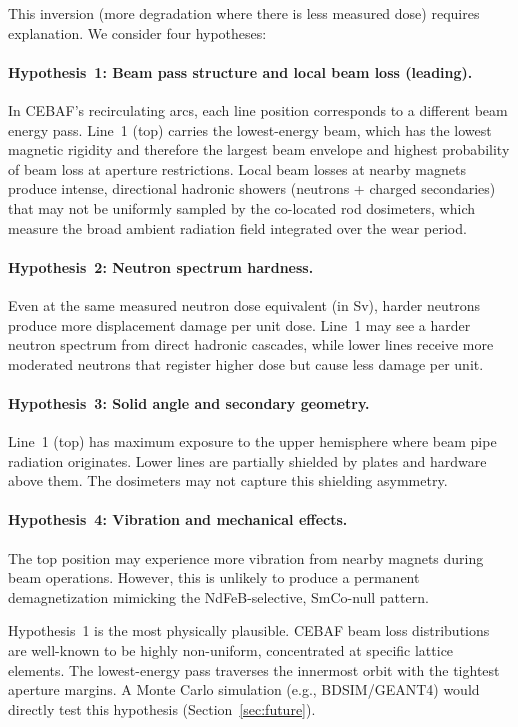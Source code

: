 \documentclass[11pt,letterpaper]{article}
\newcommand{\CEBAF}{CEBAF}
\begin{document}
This inversion (more degradation where there is less measured dose) requires
explanation. We consider four hypotheses:

\paragraph{Hypothesis~1: Beam pass structure and local beam loss (leading).}
In \CEBAF's recirculating arcs, each line position corresponds to a different
beam energy pass. Line~1 (top) carries the lowest-energy beam, which has the
lowest magnetic rigidity and therefore the largest beam envelope and
highest probability of beam loss at aperture restrictions. Local beam losses
at nearby magnets produce intense, directional hadronic showers (neutrons +
charged secondaries) that may not be uniformly sampled by the co-located rod
dosimeters, which measure the broad ambient radiation field integrated over
the wear period.

\paragraph{Hypothesis~2: Neutron spectrum hardness.}
Even at the same measured neutron dose equivalent (in Sv),
harder neutrons produce more displacement damage per unit dose. Line~1 may see
a harder neutron spectrum from direct hadronic cascades, while lower lines
receive more moderated neutrons that register higher dose but cause less
damage per unit.

\paragraph{Hypothesis~3: Solid angle and secondary geometry.}
Line~1 (top) has maximum exposure to the upper hemisphere where beam pipe
radiation originates. Lower lines are partially shielded by plates and
hardware above them. The dosimeters may not capture this shielding asymmetry.

\paragraph{Hypothesis~4: Vibration and mechanical effects.}
The top position may experience more vibration from nearby magnets during
beam operations. However, this is unlikely to produce a permanent
demagnetization mimicking the NdFeB-selective, SmCo-null pattern.

Hypothesis~1 is the most physically plausible. \CEBAF
beam loss distributions are well-known to be highly non-uniform, concentrated
at specific lattice elements. The lowest-energy pass traverses the innermost
orbit with the tightest aperture margins. A Monte Carlo simulation (e.g.,
BDSIM/GEANT4) would directly test this hypothesis (Section~\ref{sec:future}).
\end{document}
